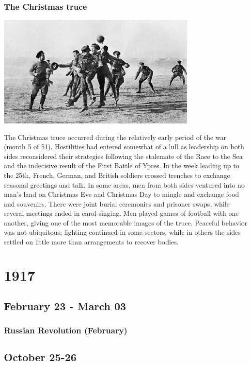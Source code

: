 \documentclass[11pt]{report}
\begin{document}
\subsection{The Christmas truce}
\vspace{2mm}\begin{center}\includegraphics[width=10cm]{./img/christmasTruce.jpg}\end{center}
The Christmas truce occurred during the relatively early period of the war (month 5 of 51). Hostilities had entered somewhat of a lull as leadership on both sides reconsidered their strategies following the stalemate of the Race to the Sea and the indecisive result of the First Battle of Ypres. In the week leading up to the 25th, French, German, and British soldiers crossed trenches to exchange seasonal greetings and talk. In some areas, men from both sides ventured into no man's land on Christmas Eve and Christmas Day to mingle and exchange food and souvenirs. There were joint burial ceremonies and prisoner swaps, while several meetings ended in carol-singing. Men played games of football with one another, giving one of the most memorable images of the truce. Peaceful behavior was not ubiquitous; fighting continued in some sectors, while in others the sides settled on little more than arrangements to recover bodies.

\chapter{1917}
\section{February 23 - March 03}
\subsection{Russian Revolution (February)}
\section{October 25-26}
\end{document}
